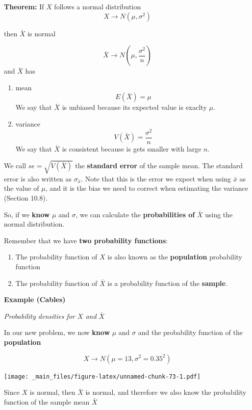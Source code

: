 \documentclass[
]{book}
\begin{document}
\textbf{Theorem:} If \(X\) follows a normal distribution \[X \rightarrow N(\mu, \sigma^2)\]

then \(\bar{X}\) is normal

\[\bar{X} \rightarrow N(\mu, \frac{\sigma^2}{n})\]
and \(\bar{X}\) has

\begin{enumerate}
\def\labelenumi{\arabic{enumi})}
\item
  mean
  \[E(\bar{X})=\mu\]
  We say that \(\bar{X}\) is unbiased because its expected value is exaclty \(\mu\).
\item
  variance
  \[V(\bar{X})=\frac{\sigma^2}{n}\]
  We say that \(\bar{X}\) is consistent because is gets smaller with large \(n\).
\end{enumerate}

We call \(se=\sqrt{V(\bar{X})}\) the \textbf{standard error} of the sample mean. The standard error is also written as \(\sigma_{\bar{x}}\). Note that this is the error we expect when using \(\bar{x}\) as the value of \(\mu\), and it is the bias we need to correct when estimating the variance (Section 10.8).

So, if we \textbf{know} \(\mu\) and \(\sigma\), we can calculate the \textbf{probabilities of} \(\bar{X}\) using the normal distribution.

Remember that we have \textbf{two probability functions}:

\begin{enumerate}
\def\labelenumi{\arabic{enumi}.}
\item
  The probability function of \(X\) is also known as the \textbf{population} probability function
\item
  The probability function of \(\bar{X}\) is a probability function of the \textbf{sample}.
\end{enumerate}

\textbf{Example (Cables)}

\emph{Probability densities for \(X\) and \(\bar{X}\)}

In our new problem, we now \textbf{know} \(\mu\) and \(\sigma\) and the probability function of the \textbf{population}

\[X \rightarrow N(\mu=13, \sigma^2=0.35^2)\]

\texttt{[image: \_main\_files/figure-latex/unnamed-chunk-73-1.pdf]}

Since \(X\) is normal, then \(\bar{X}\) is normal, and therefore we also know the probability function of the sample mean \(\bar{X}\)
\end{document}
